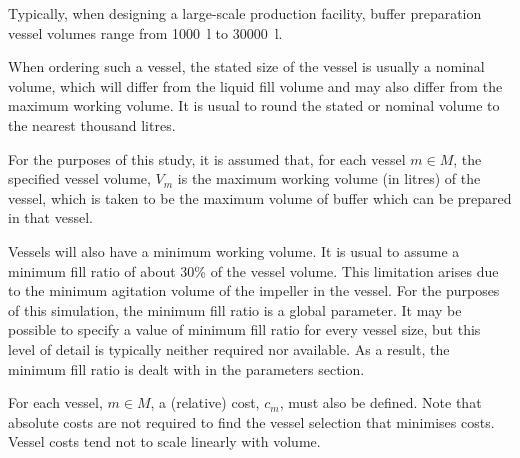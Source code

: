 Typically, when designing a large-scale production facility, buffer preparation
vessel volumes range from \SI{1000}{\litre} to \SI{30000}{\litre}.

When ordering such a vessel, the stated size of the vessel is usually a nominal
volume, which will differ from the liquid fill volume and may also differ from
the maximum working volume.
It is usual to round the stated or nominal volume to the nearest thousand
litres.

For the purposes of this study, it is assumed that, for each vessel $m \in M$,
the specified vessel volume, $V_{m}$ is the maximum working volume (in litres)
of the vessel, which is taken to be the maximum volume of buffer which can be
prepared in that vessel.

Vessels will also have a minimum working volume.
It is usual to assume a minimum fill ratio of about 30\% of the vessel volume.
This limitation arises due to the minimum agitation volume of the impeller in
the vessel.
For the purposes of this simulation, the minimum fill ratio is a global
parameter.
It may be possible to specify a value of minimum fill ratio for every vessel
size, but this level of detail is typically neither required nor available.
As a result, the minimum fill ratio is dealt with in the parameters section.

For each vessel, $m \in M$, a (relative) cost, $c_{m}$, must also be defined.
Note that absolute costs are not required to find the vessel selection that
minimises costs.
Vessel costs tend not to scale linearly with volume.

